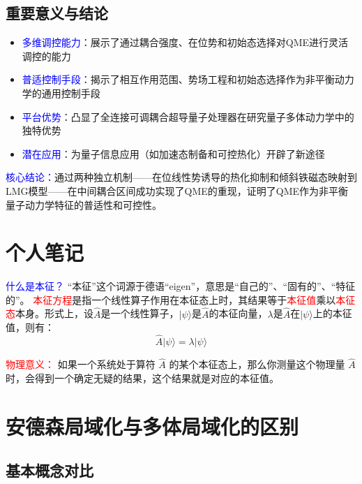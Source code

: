 \documentclass[11pt,a4paper]{article}
\begin{document}
\subsection{重要意义与结论}
\begin{itemize}
    \item \textcolor{blue}{多维调控能力}：展示了通过耦合强度、在位势和初始态选择对QME进行灵活调控的能力
    \item \textcolor{blue}{普适控制手段}：揭示了相互作用范围、势场工程和初始态选择作为非平衡动力学的通用控制手段
    \item \textcolor{blue}{平台优势}：凸显了全连接可调耦合超导量子处理器在研究量子多体动力学中的独特优势
    \item \textcolor{blue}{潜在应用}：为量子信息应用（如加速态制备和可控热化）开辟了新途径
\end{itemize}

\textcolor{blue}{核心结论：}通过两种独立机制——在位线性势诱导的热化抑制和倾斜铁磁态映射到LMG模型——在中间耦合区间成功实现了QME的重现，证明了QME作为非平衡量子动力学特征的普适性和可控性。


\section{个人笔记 }
\textcolor{blue}{什么是本征？}
“本征”这个词源于德语“eigen”，意思是“自己的”、“固有的”、“特征的”。
\textcolor{red}{本征方程}是指一个线性算子作用在本征态上时，其结果等于\textcolor{red}{本征值}乘以\textcolor{red}{本征态}本身。形式上，设$\hat{A}$是一个线性算子，$| \psi \rangle$是$\hat{A}$的本征向量，$\lambda$是$\hat{A}$在$| \psi \rangle$上的本征值，则有：
\begin{equation}
\hat{A} | \psi \rangle = \lambda | \psi \rangle
\end{equation}

\textcolor{red}{物理意义：}
如果一个系统处于算符 $\hat{A}$ 的某个本征态上，那么你测量这个物理量 $\hat{A}$ 时，会得到一个确定无疑的结果，这个结果就是对应的本征值。


\section{安德森局域化与多体局域化的区别}

\subsection{基本概念对比}
\end{document}
